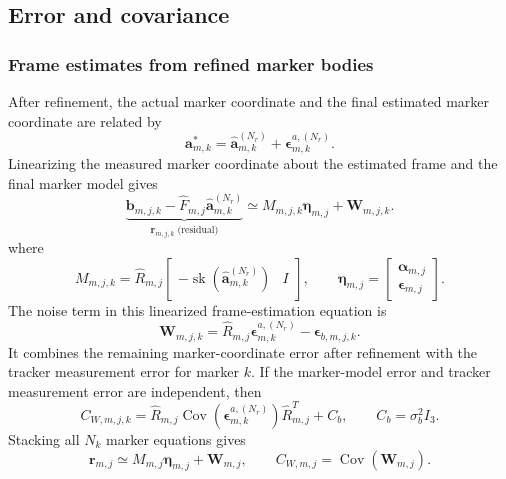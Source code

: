 \documentclass[11pt]{article}
\newcommand{\vct}[1]{\bm{#1}}
\newcommand{\sk}{\operatorname{sk}}
\newcommand{\Cov}{\operatorname{Cov}}
\begin{document}
\subsection{Error and covariance}
\subsubsection{Frame estimates from refined marker bodies}
\label{subsec:frame-estimate-covariance}
After refinement, the actual marker coordinate and the final estimated marker
coordinate are related by
\begin{equation}
\vct{a}_{m,k}^*
=
\widehat{\vct{a}}_{m,k}^{(N_r)}
+\vct{\epsilon}_{m,k}^{a,(N_r)}.
\end{equation}
Linearizing the measured marker coordinate about the estimated frame and the
final marker model gives
\begin{equation}
\underbrace{
\vct{b}_{m,j,k}
-\widehat F_{m,j}\widehat{\vct{a}}_{m,k}^{(N_r)}
}_{\vct{r}_{m,j,k}\;\text{(residual)}}
\simeq
M_{m,j,k}\vct{\eta}_{m,j}
+\vct{W}_{m,j,k}.
\end{equation}
where
\begin{equation}
\boxed{
M_{m,j,k}
=
\widehat R_{m,j}
\begin{bmatrix}
-\sk(\widehat{\vct{a}}_{m,k}^{(N_r)})&I
\end{bmatrix},
\qquad
\vct{\eta}_{m,j}
=
\begin{bmatrix}
\vct{\alpha}_{m,j}\\
\vct{\epsilon}_{m,j}
\end{bmatrix}.}
\end{equation}
The noise term in this linearized frame-estimation equation is
\begin{equation}
\boxed{
\vct{W}_{m,j,k}
=
\widehat R_{m,j}\vct{\epsilon}_{m,k}^{a,(N_r)}
-\vct{\epsilon}_{b,m,j,k}.}
\end{equation}
It combines the remaining marker-coordinate error after refinement with the
tracker measurement error for marker $k$.
If the marker-model error and tracker measurement error are independent, then
\begin{equation}
C_{W,m,j,k}
=
\widehat R_{m,j}
\Cov\!\left(\vct{\epsilon}_{m,k}^{a,(N_r)}\right)
\widehat R_{m,j}^T+C_b,
\qquad C_b=\sigma_b^2I_3.
\end{equation}
Stacking all $N_k$ marker equations gives
\begin{equation}
\vct{r}_{m,j}
\simeq
M_{m,j}\vct{\eta}_{m,j}+\vct{W}_{m,j},
\qquad
C_{W,m,j}=\Cov(\vct{W}_{m,j}).
\end{equation}
\end{document}
